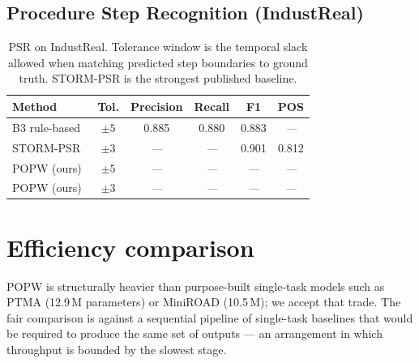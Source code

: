 \documentclass[11pt,a4paper]{article}
\newcommand{\popw}{POPW}
\newcommand{\industreal}{IndustReal}
\newcommand{\todo}{\textit{---}}              %
\newcommand{\popwres}{\todo}                  %
\begin{document}
\subsection{Procedure Step Recognition (\industreal{})}
\label{sec:psr-breakdown}

\begin{table}[!htbp]
\centering
\small
\caption{PSR on \industreal{}. Tolerance window is the temporal slack allowed when matching
predicted step boundaries to ground truth. STORM-PSR is the strongest published baseline.}
\label{tab:psr-breakdown}
\renewcommand{\arraystretch}{1.15}
\begin{tabular}{l c c c c c}
\toprule
\textbf{Method} & \textbf{Tol.} & \textbf{Precision} & \textbf{Recall} & \textbf{F1} & \textbf{POS} \\
\midrule
B3 rule-based~\cite{schoonbeek2024industreal} & $\pm 5$ & 0.885 & 0.880 & 0.883 & \todo \\
STORM-PSR~\cite{schoonbeek2025storm}          & $\pm 3$ & \todo & \todo & 0.901 & 0.812 \\
\popw{} (ours)                                & $\pm 5$ & \popwres & \popwres & \popwres & \popwres \\
\popw{} (ours)                                & $\pm 3$ & \popwres & \popwres & \popwres & \popwres \\
\bottomrule
\end{tabular}
\end{table}

\FloatBarrier
\section{Efficiency comparison}
\label{sec:efficiency}

\popw{} is structurally heavier than purpose-built single-task models such as
PTMA (12.9\,M parameters) or MiniROAD (10.5\,M); we accept that trade.
The fair comparison is against a sequential pipeline of single-task baselines
that would be required to produce the same set of outputs --- an arrangement
in which throughput is bounded by the slowest stage.
\end{document}
